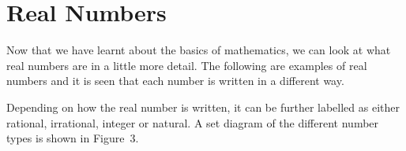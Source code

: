     \section{Real Numbers}
            \nopagebreak
      \label{m38346*id178203}Now that we have learnt about the basics of mathematics, we can look at what
real numbers are in a little more detail. The following are examples of real
numbers and it is seen that each number is written in a different way.\par 
      \label{m38346*uid52}\nopagebreak\noindent{}
      \label{m38346*id178306}Depending on how the real number is written, it can be further labelled as
either rational, irrational, integer or natural. A set diagram of the different
number types is shown in Figure~3.\par 
    \setcounter{subfigure}{0}
